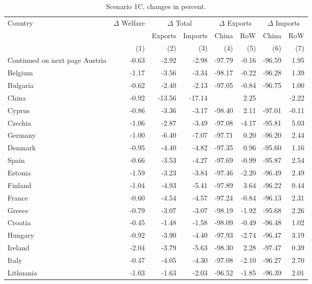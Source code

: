 \begin{longtable}{lrrrrrrr}
\caption{\label{tab:scen-1c}Scenario 1C, changes in percent.} \\ 
  \hline
  Country & $\Delta$ Welfare & \multicolumn{2}{c}{$\Delta$ Total} & \multicolumn{2}{c}{$\Delta$ Exports} & \multicolumn{2}{c}{$\Delta$ Imports} \\
&&Exports&Imports&China&RoW&China&RoW}\\\cmidrule{2-8}
&(1)&(2)&(3)&(4)&(5)&(6)&(7)} \\
\endhead
\hline
{\footnotesize Continued on next page}
\endfoot
\endlastfoot
 \hline
Austria & -0.63 & -2.92 & -2.98 & -97.79 & -0.16 & -96.59 & 1.95 \\ 
  Belgium & -1.17 & -3.56 & -3.34 & -98.17 & -0.22 & -96.28 & 1.39 \\ 
  Bulgaria & -0.62 & -2.40 & -2.13 & -97.05 & -0.84 & -96.75 & 1.00 \\ 
  China & -0.92 & -13.56 & -17.14 &  & 2.25 &  & -2.22 \\ 
  Cyprus & -0.86 & -3.36 & -3.17 & -98.40 & 2.11 & -97.01 & -0.11 \\ 
  Czechia & -1.06 & -2.87 & -3.49 & -97.08 & -4.17 & -95.81 & 5.03 \\ 
  Germany & -1.00 & -6.40 & -7.07 & -97.71 & 0.20 & -96.20 & 2.44 \\ 
  Denmark & -0.95 & -4.40 & -4.82 & -97.35 & 0.96 & -95.60 & 1.16 \\ 
  Spain & -0.66 & -3.53 & -4.27 & -97.69 & -0.99 & -95.87 & 2.54 \\ 
  Estonia & -1.59 & -3.23 & -3.84 & -97.46 & -2.20 & -96.49 & 2.49 \\ 
  Finland & -1.04 & -4.93 & -5.41 & -97.89 & 3.64 & -96.22 & 0.44 \\ 
  France & -0.60 & -4.54 & -4.57 & -97.24 & -0.84 & -96.13 & 2.31 \\ 
  Greece & -0.79 & -3.07 & -3.07 & -98.19 & -1.92 & -95.68 & 2.26 \\ 
  Croatia & -0.45 & -1.48 & -1.58 & -98.09 & -0.49 & -96.48 & 1.02 \\ 
  Hungary & -0.92 & -3.90 & -4.40 & -97.93 & -2.74 & -96.47 & 3.19 \\ 
  Ireland & -2.04 & -3.79 & -5.63 & -98.30 & 2.28 & -97.47 & 0.39 \\ 
  Italy & -0.47 & -4.05 & -4.30 & -97.08 & -2.10 & -96.27 & 2.70 \\ 
  Lithuania & -1.03 & -1.63 & -2.03 & -96.52 & -1.85 & -96.39 & 2.01 \\ 

\end{longtable}
